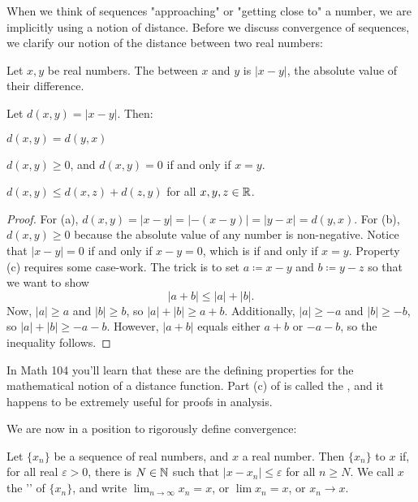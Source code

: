 \documentclass[../notes.tex]{subfiles}
\begin{document}
When we think of sequences "approaching" or "getting close to" a number, we are implicitly using a notion of distance. Before we discuss convergence of sequences, we clarify our notion of the distance between two real numbers: 

\begin{definition}
    Let $x,y$ be real numbers. The  between $x$ and $y$ is $|x-y|$, the absolute value of their difference.
\end{definition}



\begin{proposition}
\label{prop:real-metric}
    Let $d(x,y)=|x-y|$. Then:
    \begin{listalph}
        \item $d(x,y)=d(y,x)$
        \item $d(x,y)\geq 0$, and $d(x,y)=0$ if and only if $x=y$.
        \item $d(x,y) \leq d(x,z)+d(z,y)$ for all $x,y,z\in \mathbb R$.
    \end{listalph}
\end{proposition}
\begin{proof}
    For (a), $d(x,y)=|x-y|=|-(x-y)|=|y-x|=d(y,x)$. For (b), $d(x,y)\geq 0$ because the absolute value of any number is non-negative. Notice that $|x-y|=0$ if and only if $x-y=0$, which is if and only if $x=y$. Property (c) requires some case-work. The trick is to set $a\coloneqq x-y$ and $b\coloneqq y-z$ so that we want to show
    \[|a+b|\le|a|+|b|.\]
    Now, $|a|\ge a$ and $|b|\ge b$, so $|a|+|b|\ge a+b$. Additionally, $|a|\ge-a$ and $|b|\ge-b$, so $|a|+|b|\ge-a-b$. However, $|a+b|$ equals either $a+b$ or $-a-b$, so the inequality follows.
\end{proof}

In Math 104 you'll learn that these are the defining properties for the mathematical notion of a distance function. Part (c) of  is called the , and it happens to be extremely useful for proofs in analysis. 

We are now in a position to rigorously define convergence: 

\begin{definition}
    Let $\{x_n\}$ be a sequence of real numbers, and $x$ a real number. Then $\{x_n\}$  to $x$ if, for all real $\varepsilon>0$, there is $N\in\mathbb N$ such that $|x-x_n|\leq \varepsilon$ for all $n\geq N$. We call $x$ the '' of $\{x_n\}$, and write $\lim_{n\to \infty} x_n =x$, or $\lim x_n =x$, or $x_n\to x$.  
\end{definition}
\end{document}
